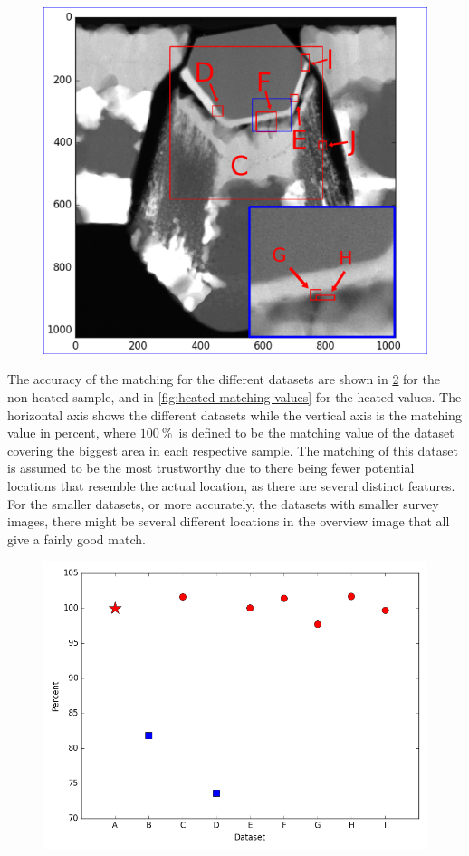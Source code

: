 \begin{figure}
	\centering
	\includegraphics[width=0.7\linewidth]{"fig/heated-images-in-overview-ink"}
	\caption{}
	\label{fig:heated-images-in-overview}
\end{figure}

The accuracy of the matching for the different datasets are shown in \cref{fig:nonheated-matching-values} for the non-heated sample, and in \cref{fig:heated-matching-values} for the heated values. The horizontal axis shows the different datasets while the vertical axis is the matching value in percent, where $\SI{100}{\percent}$ is defined to be the matching value of the dataset covering the biggest area in each respective sample. The matching of this dataset is assumed to be the most trustworthy due to there being fewer potential locations that resemble the actual location, as there are several distinct features. For the smaller datasets, or more accurately, the datasets with smaller survey images, there might be several different locations in the overview image that all give a fairly good match.

\begin{figure}
	\centering
	\includegraphics[width=0.7\linewidth]{"fig/nonheated-matching-values"}
	\caption{}
	\label{fig:nonheated-matching-values}
\end{figure}

